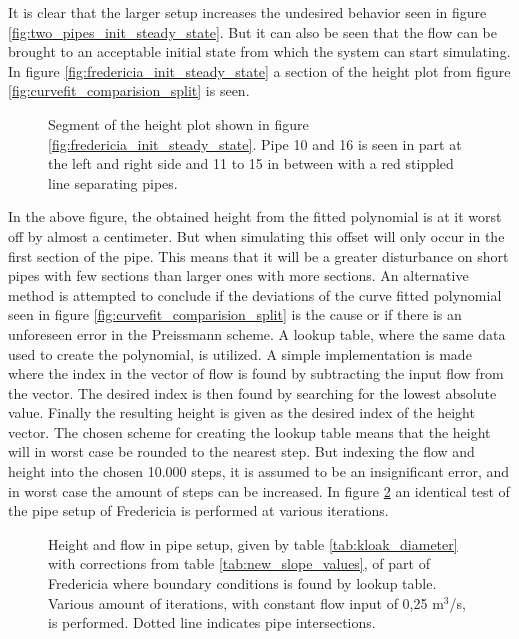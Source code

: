 {It is clear that the larger setup increases the undesired behavior seen in figure \ref{fig:two_pipes_init_steady_state}. But it can also be seen that the flow can be brought to an acceptable initial state from which the system can start simulating. In figure \ref{fig:fredericia_init_steady_state} a section of the height plot from figure \ref{fig:curvefit_comparision_split} is seen. 

\begin{figure}[H]
 \centering
 
\caption{Segment of the height plot shown in figure \ref{fig:fredericia_init_steady_state}. Pipe 10 and 16 is seen in part at the left and right side and 11 to 15 in between with a red stippled line separating pipes.}
\label{fig:fredericia_init_steady_state_zoom}
\end{figure}

In the above figure, the obtained height from the fitted polynomial is at it worst off by almost a centimeter. But when simulating this offset will only occur in the first section of the pipe. This means that it will be a greater disturbance on short pipes with few sections than larger ones with more sections. An alternative method is attempted to conclude if the deviations of the curve fitted polynomial seen in figure \ref{fig:curvefit_comparision_split} is the cause or if there is an unforeseen error in the Preissmann scheme. A lookup table, where the same data used to create the polynomial, is utilized. A simple implementation is made where the index in the vector of flow is found by subtracting the input flow from the vector. The desired index is then found by searching for the lowest absolute value. Finally the resulting height is given as the desired index of the height vector. The chosen scheme for creating the lookup table means that the height will in worst case be rounded to the nearest step. But indexing the flow and height into the chosen 10.000 steps, it is assumed to be an insignificant error, and in worst case the amount of steps can be increased. In figure \ref{fig:fredericia_init_steady_state_lut} an identical test of the pipe setup of Fredericia is performed at various iterations.      

\begin{figure}[H]
 \centering
 
\caption{Height and flow in pipe setup, given by table \ref{tab:kloak_diameter} with corrections from table \ref{tab:new_slope_values}, of part of Fredericia where boundary conditions is found by lookup table. Various amount of iterations, with constant flow input of 0,25 $\text{m}^\text{3}$/s, is performed. Dotted line indicates pipe intersections.}
\label{fig:fredericia_init_steady_state_lut}
\end{figure}

}
